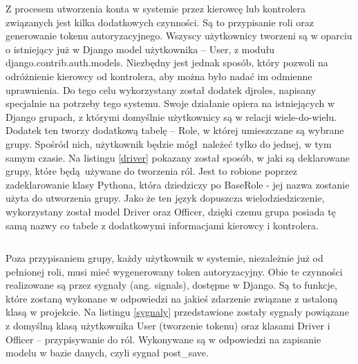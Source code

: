 Z procesem utworzenia konta w systemie przez kierowcę lub kontrolera związanych jest kilka dodatkowych czynności. Są to przypisanie roli oraz generowanie tokenu autoryzacyjnego. Wszyscy użytkownicy tworzeni są w oparciu o istniejący już w Django model użytkownika -- User, z modułu django.contrib.auth.models. Niezbędny jest jednak sposób, który pozwoli na odróżnienie kierowcy od kontrolera, aby można było nadać im odmienne uprawnienia. Do tego celu wykorzystany został dodatek djroles, napisany specjalnie na potrzeby tego systemu. Swoje działanie opiera na istniejących w Django grupach, z którymi domyślnie użytkownicy są w relacji wiele-do-wielu. Dodatek ten tworzy dodatkową tabelę -- Role, w której umieszczane są wybrane grupy. Spośród nich, użytkownik będzie mógł należeć tylko do jednej, w tym samym czasie. Na listingu \ref{driver} pokazany został sposób, w jaki są deklarowane grupy, które będą używane do tworzenia ról. Jest to robione poprzez zadeklarowanie klasy Pythona, która dziedziczy po BaseRole - jej nazwa zostanie użyta do utworzenia grupy. Jako że ten język dopuszcza wielodziedziczenie, wykorzystany został model Driver oraz Officer, dzięki czemu grupa posiada tę samą nazwy co tabele z dodatkowymi informacjami kierowcy i kontrolera.

\begin{singlespace}
	\label{driver}
	\vspace{0.3cm}
	\inputminted[fontsize=\footnotesize, linenos=true]{python}{src/imp/driver.py}
\end{singlespace}

\vspace{0.3cm}

Poza przypisaniem grupy, każdy użytkownik w systemie, niezależnie już od pełnionej roli, musi mieć wygenerowany token autoryzacyjny. Obie te czynności realizowane są przez sygnały (ang. signals), dostępne w Django. Są to funkcje, które zostaną wykonane w odpowiedzi na jakieś zdarzenie związane z ustaloną klasą w projekcie. Na listingu \ref{sygnaly} przedstawione zostały sygnały powiązane z domyślną klasą użytkownika User (tworzenie tokenu) oraz klasami Driver i Officer -- przypisywanie do ról. Wykonywane są w odpowiedzi na zapisanie modelu w bazie danych, czyli sygnał post\_save.

\begin{singlespace}
	\label{sygnaly}
	\vspace{0.3cm}
	\inputminted[fontsize=\footnotesize, linenos=true]{python}{src/imp/token_signal.py}
\end{singlespace}


